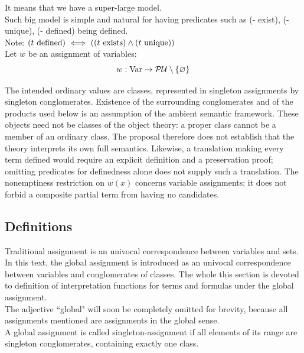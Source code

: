 It means that we have a super-large model.\\
Such big model is simple and natural for having predicates such as (- exist), (- unique), (- defined) being defined.\\
Note: $(t\mathrm{\ defined})\ \Longleftrightarrow\  ((t\mathrm{\ exists})\land(t\mathrm{\ unique}))$\\


Let $w$ be an assignment of variables:\\
\[
w:\mathrm{Var}\to \mathcal{P} \mathcal{U}\setminus\{\varnothing\}
\]

The intended ordinary values are classes, represented in singleton
assignments by singleton conglomerates. Existence of the surrounding
conglomerates and of the products used below is an assumption of the
ambient semantic framework. These objects need not be classes of the
object theory: a proper class cannot be a member of an ordinary class.
The proposal therefore does not establish that the theory interprets its
own full semantics. Likewise, a translation making every term defined
would require an explicit definition and a preservation proof; omitting
predicates for definedness alone does not supply such a translation.
The nonemptiness restriction on $w(x)$ concerns variable assignments;
it does not forbid a composite partial term from having no candidates.

\subsection{Definitions}
Traditional assignment is an univocal correspondence between variables and sets. In this text, the global assignment is introduced as an univocal correspondence between variables and conglomerates%
 of classes. 
The whole this section is devoted to definition of interpretation functions for terms and formulas under the global assignment.\\ 
 The adjective ``global" will soon be completely omitted for brevity, because all assignments mentioned are assignments in the global sense.\\
A global assignment is called singleton-assignment if all elements of its range are singleton conglomerates, containing exactly one class.\\

